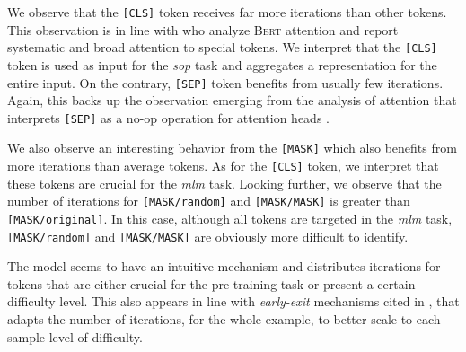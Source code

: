 We observe that the \texttt{[CLS]} token receives far more iterations than other tokens. This observation is in line with \textcite{clark_19} who analyze \textsc{Bert}  attention and report systematic and broad attention to special tokens. We interpret that the \texttt{[CLS]} token is used as input for the \textit{sop} task and aggregates a representation for the entire input. On the contrary, \texttt{[SEP]} token benefits from usually few iterations. Again, this backs up the observation emerging from the analysis of attention that interprets \texttt{[SEP]} as a no-op operation for attention heads \parencite{clark_19}.


We also observe an interesting behavior from the \texttt{[MASK]} which also benefits from more iterations than average tokens. As for the \texttt{[CLS]} token, we interpret that these tokens are crucial for the \textit{mlm} task. Looking further, we observe that the number of iterations for \texttt{[MASK/random]} and \texttt{[MASK/MASK]} is greater than \texttt{[MASK/original]}. In this case, although all tokens are targeted in the \textit{mlm} task, \texttt{[MASK/random]} and \texttt{[MASK/MASK]} are  obviously more difficult to identify.

The model seems to have an intuitive mechanism and distributes iterations for tokens that are either crucial for the pre-training task or present a certain difficulty level. This also appears in line with \textit{early-exit} mechanisms cited in , that adapts the number of iterations, for the whole example, to better scale to each sample level of difficulty.

